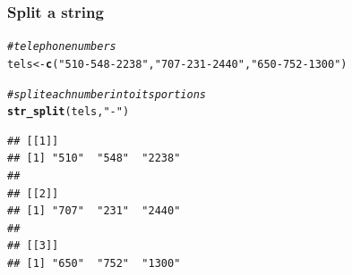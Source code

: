 \documentclass[12pt]{beamer}\usepackage[]{graphicx}\usepackage[]{color}
\makeatletter
\newcommand{\hlstr}[1]{\textcolor[rgb]{0.192,0.494,0.8}{#1}}%
\newcommand{\hlcom}[1]{\textcolor[rgb]{0.678,0.584,0.686}{\textit{#1}}}%
\newcommand{\hlstd}[1]{\textcolor[rgb]{0.345,0.345,0.345}{#1}}%
\newcommand{\hlkwb}[1]{\textcolor[rgb]{0.69,0.353,0.396}{#1}}%
\newcommand{\hlkwd}[1]{\textcolor[rgb]{0.737,0.353,0.396}{\textbf{#1}}}%
\newenvironment{kframe}{%
 \def\at@end@of@kframe{}%
 \ifinner\ifhmode%
  \def\at@end@of@kframe{\end{minipage}}%
  \begin{minipage}{\columnwidth}%
 \fi\fi%
 \def\FrameCommand##1{\hskip\@totalleftmargin \hskip-\fboxsep
 \colorbox{shadecolor}{##1}\hskip-\fboxsep
     \hskip-\linewidth \hskip-\@totalleftmargin \hskip\columnwidth}%
 \MakeFramed {\advance\hsize-\width
   \@totalleftmargin\z@ \linewidth\hsize
   \@setminipage}}%
 {\par\unskip\endMakeFramed%
 \at@end@of@kframe}
\newenvironment{knitrout}{}{} %
\makeatother
\begin{document}
\begin{frame}[fragile]
\frametitle{Split a string}

\begin{knitrout}\footnotesize
{}\color{fgcolor}\begin{kframe}
\begin{alltt}
\hlcom{# telephone numbers}
\hlstd{tels} \hlkwb{<-} \hlkwd{c}\hlstd{(}\hlstr{"510-548-2238"}\hlstd{,} \hlstr{"707-231-2440"}\hlstd{,} \hlstr{"650-752-1300"}\hlstd{)}

\hlcom{# split each number into its portions}
\hlkwd{str_split}\hlstd{(tels,} \hlstr{"-"}\hlstd{)}
\end{alltt}
\begin{verbatim}
## [[1]]
## [1] "510"  "548"  "2238"
## 
## [[2]]
## [1] "707"  "231"  "2440"
## 
## [[3]]
## [1] "650"  "752"  "1300"
\end{verbatim}
\end{kframe}
\end{knitrout}

\end{frame}


\end{document}
